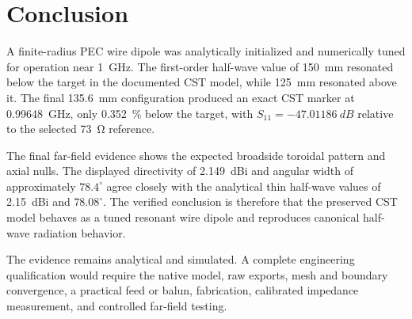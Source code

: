 \section{Conclusion}

A finite-radius PEC wire dipole was analytically initialized and numerically tuned for
operation near \SI{1}{GHz}. The first-order half-wave value of \SI{150}{mm} resonated
below the target in the documented CST model, while \SI{125}{mm} resonated above it.
The final \SI{135.6}{mm} configuration produced an exact CST marker at
\SI{0.99648}{GHz}, only \SI{0.352}{\percent} below the target, with
$S_{11}=-\SI{47.01186}{dB}$ relative to the selected \SI{73}{\ohm} reference.

The final far-field evidence shows the expected broadside toroidal pattern and axial
nulls. The displayed directivity of \SI{2.149}{dBi} and angular width of approximately
$78.4^\circ$ agree closely with the analytical thin half-wave values of
\SI{2.15}{dBi} and $78.08^\circ$. The verified conclusion is therefore that the preserved
CST model behaves as a tuned resonant wire dipole and reproduces canonical half-wave
radiation behavior.

The evidence remains analytical and simulated. A complete engineering qualification
would require the native model, raw exports, mesh and boundary convergence, a practical
feed or balun, fabrication, calibrated impedance measurement, and controlled far-field
testing.
